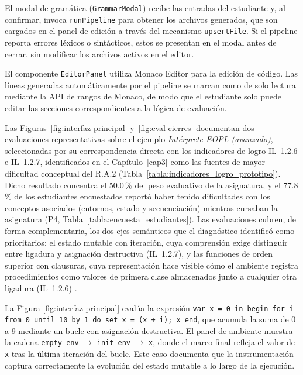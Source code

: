 \FloatBarrier

El modal de gramática (\texttt{Grammar\allowbreak Modal}) recibe las entradas del estudiante y, al confirmar, invoca \texttt{run\allowbreak Pipeline} para obtener los archivos generados, que son cargados en el panel de edición a través del mecanismo \texttt{upsert\allowbreak File}. Si el pipeline reporta errores léxicos o sintácticos, estos se presentan en el modal antes de cerrar, sin modificar los archivos activos en el editor.

El componente \texttt{Editor\allowbreak Panel} utiliza Monaco Editor \cite{monaco} para la edición de código. Las líneas generadas automáticamente por el pipeline se marcan como de solo lectura mediante la API de rangos de Monaco, de modo que el estudiante solo puede editar las secciones correspondientes a la lógica de evaluación.

Las Figuras~\ref{fig:interfaz-principal} y~\ref{fig:eval-cierres} documentan dos evaluaciones representativas sobre el ejemplo \textit{Intérprete EOPL (avanzado)}, seleccionadas por su correspondencia directa con los indicadores de logro IL~1.2.6 e IL~1.2.7, identificados en el Capítulo~\ref{cap3} como las fuentes de mayor dificultad conceptual del R.A.2 (Tabla~\ref{tabla:indicadores_logro_prototipo}). Dicho resultado concentra el 50.0\,\% del peso evaluativo de la asignatura, y el 77.8\,\% de los estudiantes encuestados reportó haber tenido dificultades con los conceptos asociados (entornos, estado y secuenciación) mientras cursaban la asignatura (P4, Tabla~\ref{tabla:encuesta_estudiantes}). Las evaluaciones cubren, de forma complementaria, los dos ejes semánticos que el diagnóstico identificó como prioritarios: el estado mutable con iteración, cuya comprensión exige distinguir entre ligadura y asignación destructiva (IL~1.2.7), y las funciones de orden superior con clausuras, cuya representación hace visible cómo el ambiente registra procedimientos como valores de primera clase almacenados junto a cualquier otra ligadura (IL~1.2.6) \cite{Friedman2008EPL}.

La Figura \ref{fig:interfaz-principal} evalúa la expresión \texttt{var x = 0 in begin for i from 0 until 10 by 1 do set x = (x + i); x end}, que acumula la suma de 0 a 9 mediante un bucle con asignación destructiva. El panel de ambiente muestra la cadena \texttt{empty-env} $\to$ \texttt{init-env} $\to$ \texttt{x}, donde el marco final refleja el valor de \texttt{x} tras la última iteración del bucle. Este caso documenta que la instrumentación captura correctamente la evolución del estado mutable a lo largo de la ejecución.

